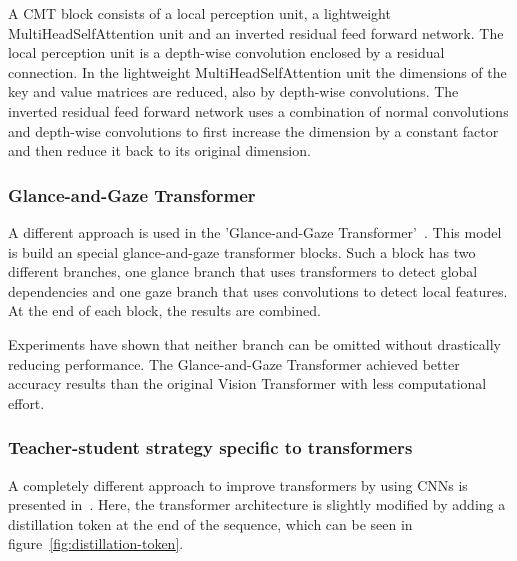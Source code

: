 \documentclass[a4paper]{scrartcl}
\begin{document}
    A CMT block consists of a local perception unit, a lightweight MultiHeadSelfAttention unit and an inverted residual feed forward network.
    The local perception unit is a depth-wise convolution enclosed by a residual connection.
    In the lightweight MultiHeadSelfAttention unit the dimensions of the key and value matrices are reduced, also by depth-wise convolutions.
    The inverted residual feed forward network uses a combination of normal convolutions and depth-wise convolutions to first increase the dimension by a constant factor and then reduce it back to its original dimension.

    \subsubsection{Glance-and-Gaze Transformer}
    A different approach is used in the 'Glance-and-Gaze Transformer'~\cite{yu2021glanceandgaze}.
    This model is build an special glance-and-gaze transformer blocks.
    Such a block has two different branches, one glance branch that uses transformers to detect global dependencies and one gaze branch that uses convolutions to detect local features.
    At the end of each block, the results are combined.

    Experiments have shown that neither branch can be omitted without drastically reducing performance.
    The Glance-and-Gaze Transformer achieved better accuracy results than the original Vision Transformer with less computational effort.

    \subsubsection{Teacher-student strategy specific to transformers}
    A completely different approach to improve transformers by using CNNs is presented in~\cite{touvron2021training}.
    Here, the transformer architecture is slightly modified by adding a distillation token at the end of the sequence, which can be seen in figure~\ref{fig:distillation-token}.
\end{document}
